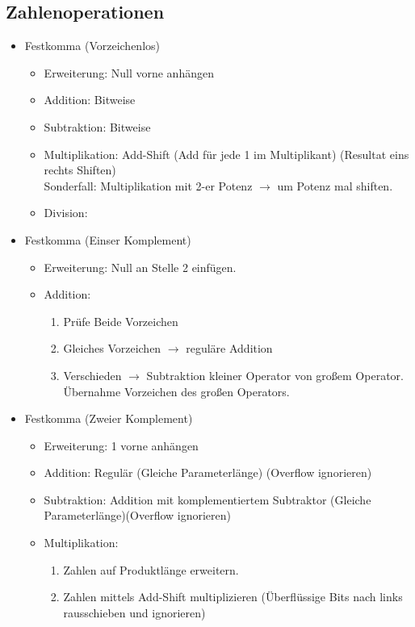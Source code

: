 \documentclass[6pt,a4paper]{scrartcl}
\begin{document}
\begin{multicols*}{3}
\subsection{Zahlenoperationen}
\begin{itemize}
	\item Festkomma (Vorzeichenlos)
	\begin{itemize}
		\item Erweiterung: Null vorne anhängen
		\item Addition: Bitweise
		\item Subtraktion: Bitweise
		\item Multiplikation: Add-Shift (Add für jede 1 im Multiplikant) (Resultat eins rechts Shiften)\\
		Sonderfall: Multiplikation mit 2-er Potenz $\rightarrow$ um Potenz mal shiften.
		\item Division:
	\end{itemize}
	\item Festkomma (Einser Komplement)
	\begin{itemize}
		\item Erweiterung: Null an Stelle 2 einfügen.
		\item Addition:
		\begin{enumerate}
			\item Prüfe Beide Vorzeichen
			\item Gleiches Vorzeichen $\rightarrow$ reguläre Addition
			\item Verschieden $\rightarrow$ Subtraktion kleiner Operator von großem Operator. Übernahme Vorzeichen des großen Operators.
		\end{enumerate}
	\end{itemize}
	\item Festkomma (Zweier Komplement)
	\begin{itemize}
		\item Erweiterung: 1 vorne anhängen
		\item Addition: Regulär (Gleiche Parameterlänge) (Overflow ignorieren)
		\item Subtraktion: Addition mit komplementiertem Subtraktor (Gleiche Parameterlänge)(Overflow ignorieren)
		\item Multiplikation:
		\begin{enumerate}
			\item Zahlen auf Produktlänge erweitern.
			\item Zahlen mittels Add-Shift multiplizieren (Überflüssige Bits nach links rausschieben und ignorieren)

\end{enumerate}
\end{itemize}
\end{itemize}
\end{multicols*}
\end{document}
